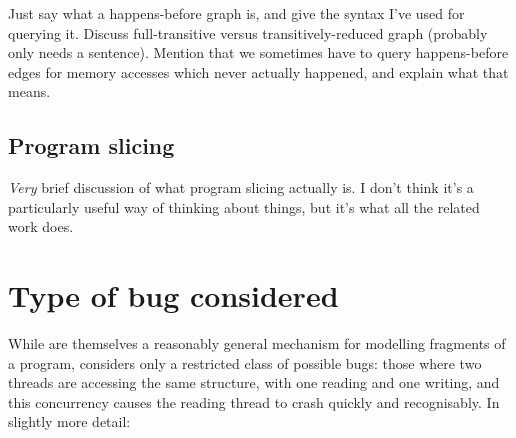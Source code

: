 Just say what a happens-before graph is, and give the syntax I've used
for querying it.  Discuss full-transitive versus transitively-reduced
graph (probably only needs a sentence).  Mention that we sometimes
have to query happens-before edges for memory accesses which never
actually happened, and explain what that means.

\subsection{Program slicing}

\emph{Very} brief discussion of what program slicing actually is.  I
don't think it's a particularly useful way of thinking about things,
but it's what all the related work does.

\section{Type of bug considered}
\label{sect:intro:types_of_bugs}

While {\StateMachines} are themselves a reasonably general mechanism
for modelling fragments of a program, {\implementation} considers only
a restricted class of possible bugs: those where two threads are
accessing the same structure, with one reading and one writing, and
this concurrency causes the reading thread to crash quickly and
recognisably.  In slightly more detail:

